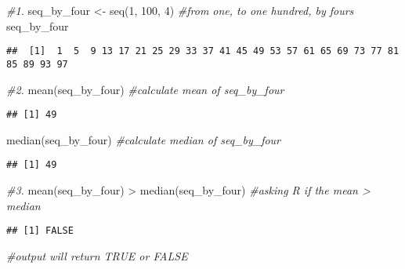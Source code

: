 \documentclass[
]{article}
\newenvironment{Shaded}{\begin{snugshade}}{\end{snugshade}}
\newcommand{\CommentTok}[1]{\textcolor[rgb]{0.56,0.35,0.01}{\textit{#1}}}
\newcommand{\DecValTok}[1]{\textcolor[rgb]{0.00,0.00,0.81}{#1}}
\newcommand{\FunctionTok}[1]{\textcolor[rgb]{0.00,0.00,0.00}{#1}}
\newcommand{\NormalTok}[1]{#1}
\newcommand{\OtherTok}[1]{\textcolor[rgb]{0.56,0.35,0.01}{#1}}
\newcommand{\SpecialCharTok}[1]{\textcolor[rgb]{0.00,0.00,0.00}{#1}}
\begin{document}
\begin{Shaded}
\begin{Highlighting}[]
\CommentTok{\#1. }
\NormalTok{seq\_by\_four }\OtherTok{\textless{}{-}} \FunctionTok{seq}\NormalTok{(}\DecValTok{1}\NormalTok{, }\DecValTok{100}\NormalTok{, }\DecValTok{4}\NormalTok{) }\CommentTok{\#from one, to one hundred, by fours}
\NormalTok{seq\_by\_four}
\end{Highlighting}
\end{Shaded}

\begin{verbatim}
##  [1]  1  5  9 13 17 21 25 29 33 37 41 45 49 53 57 61 65 69 73 77 81 85 89 93 97
\end{verbatim}

\begin{Shaded}
\begin{Highlighting}[]
\CommentTok{\#2. }
\FunctionTok{mean}\NormalTok{(seq\_by\_four) }\CommentTok{\#calculate mean of seq\_by\_four}
\end{Highlighting}
\end{Shaded}

\begin{verbatim}
## [1] 49
\end{verbatim}

\begin{Shaded}
\begin{Highlighting}[]
\FunctionTok{median}\NormalTok{(seq\_by\_four) }\CommentTok{\#calculate median of seq\_by\_four}
\end{Highlighting}
\end{Shaded}

\begin{verbatim}
## [1] 49
\end{verbatim}

\begin{Shaded}
\begin{Highlighting}[]
\CommentTok{\#3. }
\FunctionTok{mean}\NormalTok{(seq\_by\_four) }\SpecialCharTok{\textgreater{}} \FunctionTok{median}\NormalTok{(seq\_by\_four) }\CommentTok{\#asking R if the mean \textgreater{} median}
\end{Highlighting}
\end{Shaded}

\begin{verbatim}
## [1] FALSE
\end{verbatim}

\begin{Shaded}
\begin{Highlighting}[]
\CommentTok{\#output will return TRUE or FALSE}
\end{Highlighting}
\end{Shaded}
\end{document}
